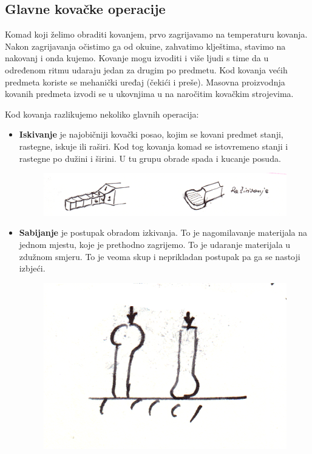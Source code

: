 \documentclass[a4paper,12pt]{article}
\numberwithin{figure}{section}
\begin{document}
\subsection{Glavne kovačke operacije}
Komad koji želimo obraditi kovanjem, prvo zagrijavamo na temperaturu kovanja. Nakon zagrijavanja očistimo ga od okuine, zahvatimo klještima, stavimo na nakovanj i onda kujemo. Kovanje mogu izvoditi i više ljudi s time da u određenom ritmu udaraju jedan za drugim po predmetu. Kod kovanja većih predmeta koriste se mehanički uređaj (čekići i preše). Masovna proizvodnja kovanih predmeta izvodi se u ukovnjima u na naročitim kovačkim strojevima.\par
Kod kovanja razlikujemo nekoliko glavnih operacija:
\begin{itemize}
\item \textbf{Iskivanje} je najobičniji kovački posao, kojim se kovani predmet stanji, rastegne, iskuje ili raširi. Kod tog kovanja komad se istovremeno stanji i rastegne po dužini i širini. U tu grupu obrade spada i kucanje posuda.
\begin{figure}[!h]
\centering
\includegraphics[scale=0.15]{image_41-1.png}
\end{figure}
\FloatBarrier
\item \textbf{Sabijanje} je postupak obradom izkivanja. To je nagomilavanje materijala na jednom mjestu, koje je prethodno zagrijemo. To je udaranje materijala u zdužnom smjeru. To je veoma skup i neprikladan postupak pa ga se nastoji izbjeći.
\begin{figure}[!h]
\centering
\includegraphics[scale=0.1]{image_41-2.png}

\end{figure}
\end{itemize}
\end{document}
